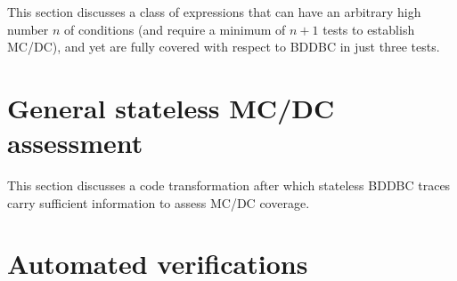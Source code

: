 \documentclass[a4paper,12pt,twoside]{article}
\begin{document}
This section discusses a class of expressions that can have an arbitrary
high number $n$ of conditions (and require a minimum of $n+1$ tests to
establish MC/DC), and yet are fully covered with respect to BDDBC in
just three tests.

\section{General stateless MC/DC assessment}

This section discusses a code transformation after which stateless BDDBC
traces carry sufficient information to assess MC/DC coverage.

\section{Automated verifications}

\newpage


\end{document}
